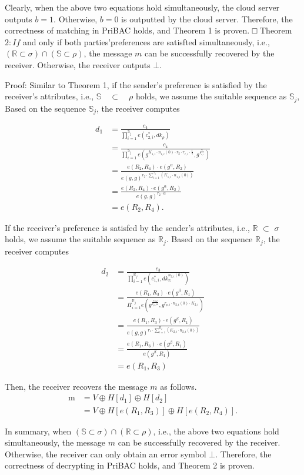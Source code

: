 \documentclass[runningheads]{llncs}
\begin{document}
Clearly, when the above two equations hold simultaneously, the cloud server outputs $b = 1$. Otherwise, $b = 0$ is outputted by the cloud server. Therefore, the correctness of matching in PriBAC holds, and Theorem 1 is proven.
□
Theorem $2:If$ and only if both parties’preferences are satisfted simultaneously, i.e., $(\mathbb{R}\subset\sigma)\cap(\mathbb{S}\subset\rho)$, the message $m$ can be successfully recovered by the receiver. Otherwise, the receiver outputs $\bot.$

Proof: Similar to Theorem 1, if the sender’s preference is satisfied by the receiver’s attributes, i.e., $\mathbb{S}\quad\subset\quad\rho$ holds, we assume the suitable sequence as $\mathbb{S}_j$, Based on the sequence $\mathbb{S}_j$, the receiver computes

$$\begin{aligned}d_{1}&=\frac{c_4}{\prod_{i=1}^{\mathbb{S}_j}e(c_{2,i}^*,dk_\rho)}\\&=\frac{c_4}{\prod_{i=1}^{\mathbb{S}_j}e(g^{K_{1,i}\cdot n_{1,i}(0)\cdot r_2\cdot r_{e,i}\cdot\frac{1}{\gamma}},g^{\frac{\gamma}{r_{e,i}}})}\\&=\frac{e(R_2,R_4)\cdot e(g^\alpha,R_2)}{e(g,g)^{r_2\cdot\sum_{i=1}^{\mathbb{S}_j}(K_{1,i}\cdot n_{1,i}(0))}}\\&=\frac{e(R_2,R_4)\cdot e(g^\alpha,R_2)}{e(g,g)^{r_2\cdot\alpha}}\\&=e(R_2,R_4).\end{aligned}$$

If the receiver's preference is satisfed by the sender's attributes, i.e., $\mathbb{R}$ $\subset$ $\sigma$ holds, we assume the suitable sequence as $\mathbb{R}_j.$ Based on the sequence $\mathbb{R}_j$, the receiver computes

$$\begin{aligned}d_{2}&=\frac{c_3}{\prod_{i=1}^{\mathbb{R}_j}e(c_{1,i}^*,dk_{\mathbb{S}}^{n_{2,i}(0)})}\\&=\frac{e(R_1,R_3)\cdot e(g^\beta,R_1)}{\Pi_{i=1}^{\mathbb{R}_j}e(g^{\frac{r_1\omega}{r_{p,i}\omega}},g^{r_{p,i}\cdot n_{2,i}(0)\cdot K_{2,i}})}\\&=\frac{e(R_1,R_3)\cdot e(g^\beta,R_1)}{e(g,g)^{r_1\cdot\sum_{i=1}^{R_j}(K_{2,i}\cdot n_{2,i}(0))}}\\&=\frac{e(R_1,R_3)\cdot e(g^\beta,R_1)}{e(g^\beta,R_1)}\\&=e(R_1,R_3)\end{aligned}$$

Then, the receiver recovers the message $m$ as follows.
$$\begin{aligned}\mathrm{m}&=V\oplus H[d_1]\oplus H[d_2]\\&=V\oplus H[e(R_1,R_3)]\oplus H[e(R_2,R_4)].\end{aligned}$$

In summary, when $(\mathbb{S}\subset\sigma)\cap(\mathbb{R}\subset\rho)$, i.e., the above two equations hold simultaneously, the message $m$ can be successfully recovered by the receiver. Otherwise, the receiver can only obtain an error symbol $\bot.$ Therefore, the correctness of decrypting in PriBAC holds, and Theorem 2 is proven.
\end{document}
